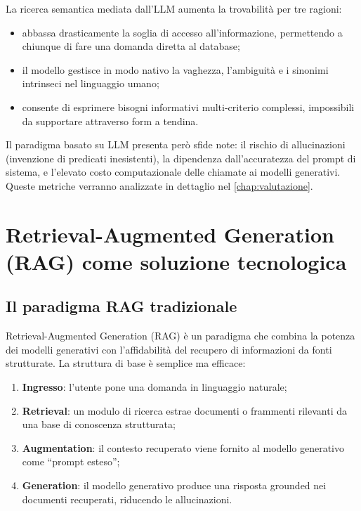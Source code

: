     La ricerca semantica mediata dall'LLM aumenta la trovabilità per tre ragioni:

    \begin{itemize}
        \item abbassa drasticamente la soglia di accesso all'informazione, permettendo a chiunque di fare una domanda diretta al database;
        \item il modello gestisce in modo nativo la vaghezza, l'ambiguità e i sinonimi intrinseci nel linguaggio umano;
        \item consente di esprimere bisogni informativi multi-criterio complessi, impossibili da supportare attraverso form a tendina.
    \end{itemize}

    Il paradigma basato su LLM presenta però sfide note: il rischio di allucinazioni (invenzione di predicati inesistenti), la dipendenza dall'accuratezza del prompt di sistema, e l'elevato costo computazionale delle chiamate ai modelli generativi. Queste metriche verranno analizzate in dettaglio nel \cref{chap:valutazione}.


\section{Retrieval-Augmented Generation (RAG) come soluzione tecnologica}\label{sec:rag}
    \subsection{Il paradigma RAG tradizionale}\label{subsec:rag_trad}

    Retrieval-Augmented Generation (RAG) è un paradigma che combina la potenza dei modelli generativi con l'affidabilità del recupero di informazioni da fonti strutturate. La struttura di base è semplice ma efficace:

    \begin{enumerate}
        \item \textbf{Ingresso}: l'utente pone una domanda in linguaggio naturale;
        \item \textbf{Retrieval}: un modulo di ricerca estrae documenti o frammenti rilevanti da una base di conoscenza strutturata;
        \item \textbf{Augmentation}: il contesto recuperato viene fornito al modello generativo come ``prompt esteso'';
        \item \textbf{Generation}: il modello generativo produce una risposta grounded nei documenti recuperati, riducendo le allucinazioni.
    \end{enumerate}

